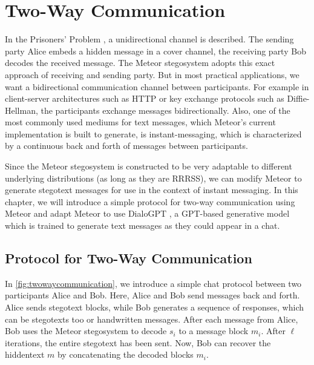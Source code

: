 \chapter{Two-Way Communication}
\label{chap:twowaycommunication}


In the Prisoners' Problem \cite{Simmons1983}, a unidirectional channel is described.
The sending party Alice embeds a hidden message in a cover channel, the receiving party Bob decodes the received message.
The Meteor stegosystem adopts this exact approach of receiving and sending party.
But in most practical applications, we want a bidirectional communication channel between participants.
For example in client-server architectures such as HTTP or key exchange protocols such as Diffie-Hellman, the participants exchange messages bidirectionally.
Also, one of the most commonly used mediums for text messages, which Meteor's current implementation is built to generate, is instant-messaging, which is characterized by a continuous back and forth of messages between participants.

Since the Meteor stegosystem is constructed to be very adaptable to different underlying distributions (as long as they are RRRSS), we can modify Meteor to generate stegotext messages for use in the context of instant messaging.
In this chapter, we will introduce a simple protocol for two-way communication using Meteor and adapt Meteor to use DialoGPT \cite{Zhang2020}, a GPT-based generative model which is trained to generate text messages as they could appear in a chat.

\section{Protocol for Two-Way Communication}

In \autoref{fig:twowaycommunication}, we introduce a simple chat protocol between two participants Alice and Bob.
Here, Alice and Bob send messages back and forth.
Alice sends stegotext blocks, while Bob generates a sequence of responses, which can be stegotexts too or handwritten messages.
After each message from Alice, Bob uses the Meteor stegosystem to decode $s_i$ to a message block $m_i$.
After $\ell$ iterations, the entire stegotext has been sent.
Now, Bob can recover the hiddentext $m$ by concatenating the decoded blocks $m_i$.


